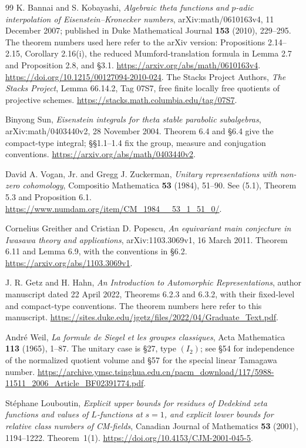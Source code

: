 \documentclass[11pt,a4paper]{article}
\theoremstyle{remark}
\begin{document}
\begin{thebibliography}{99}
K. Bannai and S. Kobayashi,
\emph{Algebraic theta functions and $p$-adic interpolation of
Eisenstein--Kronecker numbers},
arXiv:math/0610163v4, 11 December 2007;
published in Duke Mathematical Journal \textbf{153} (2010), 229--295.
The theorem numbers used here refer to the arXiv version:
Propositions 2.14--2.15, Corollary 2.16(i),
the reduced Mumford-translation formula in Lemma 2.7 and
Proposition 2.8, and \S3.1.
\url{https://arxiv.org/abs/math/0610163v4}.
\url{https://doi.org/10.1215/00127094-2010-024}.
The Stacks Project Authors,
\emph{The Stacks Project}, Lemma 66.14.2, Tag 07S7,
free finite locally free quotients of projective schemes.
\url{https://stacks.math.columbia.edu/tag/07S7}.

Binyong Sun, \emph{Eisenstein integrals for theta stable parabolic
subalgebras}, arXiv:math/0403440v2, 28 November 2004.
Theorem 6.4 and \S6.4 give the compact-type integral;
\S\S1.1--1.4 fix the group, measure and conjugation conventions.
\url{https://arxiv.org/abs/math/0403440v2}.

David A. Vogan, Jr. and Gregg J. Zuckerman,
\emph{Unitary representations with non-zero cohomology},
Compositio Mathematica \textbf{53} (1984), 51--90.
See (5.1), Theorem 5.3 and Proposition 6.1.
\url{https://www.numdam.org/item/CM_1984__53_1_51_0/}.

Cornelius Greither and Cristian D. Popescu,
\emph{An equivariant main conjecture in Iwasawa theory and applications},
arXiv:1103.3069v1, 16 March 2011.
Theorem 6.11 and Lemma 6.9, with the conventions in \S6.2.
\url{https://arxiv.org/abs/1103.3069v1}.


J. R. Getz and H. Hahn,
\emph{An Introduction to Automorphic Representations},
author manuscript dated 22 April 2022, Theorems 6.2.3
and 6.3.2, with their fixed-level and compact-type conventions.
The theorem numbers here refer to this manuscript.
\url{https://sites.duke.edu/jgetz/files/2022/04/Graduate_Text.pdf}.

Andr\'e Weil,
\emph{La formule de Siegel et les groupes classiques},
Acta Mathematica \textbf{113} (1965), 1--87.
The unitary case is \S27, type $(I_2)$; see \S54 for
independence of the normalized quotient volume and
\S57 for the special linear Tamagawa number.
\url{https://archive.ymsc.tsinghua.edu.cn/pacm_download/117/5988-11511_2006_Article_BF02391774.pdf}.

St\'ephane Louboutin,
\emph{Explicit upper bounds for residues of Dedekind zeta functions
and values of $L$-functions at $s=1$, and explicit lower bounds
for relative class numbers of CM-fields},
Canadian Journal of Mathematics \textbf{53} (2001), 1194--1222.
Theorem~1(1).
\url{https://doi.org/10.4153/CJM-2001-045-5}.


\end{thebibliography}
\end{document}
